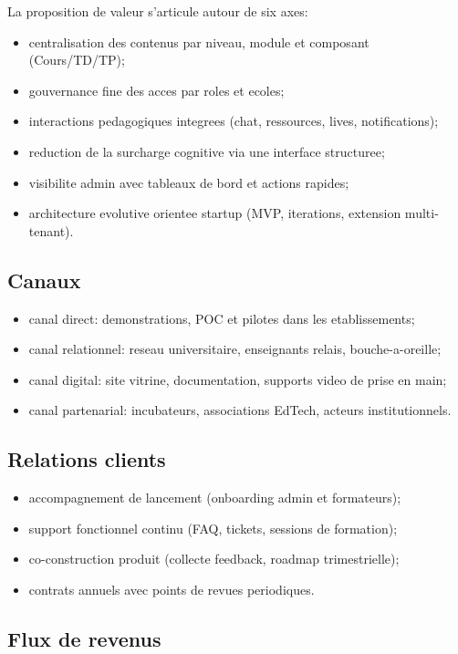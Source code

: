 ﻿\documentclass[12pt,a4paper,oneside]{report}
\begin{document}
La proposition de valeur s'articule autour de six axes:
\begin{itemize}
  \item centralisation des contenus par niveau, module et composant (Cours/TD/TP);
  \item gouvernance fine des acces par roles et ecoles;
  \item interactions pedagogiques integrees (chat, ressources, lives, notifications);
  \item reduction de la surcharge cognitive via une interface structuree;
  \item visibilite admin avec tableaux de bord et actions rapides;
  \item architecture evolutive orientee startup (MVP, iterations, extension multi-tenant).
\end{itemize}

\subsection{Canaux}

\begin{itemize}
  \item canal direct: demonstrations, POC et pilotes dans les etablissements;
  \item canal relationnel: reseau universitaire, enseignants relais, bouche-a-oreille;
  \item canal digital: site vitrine, documentation, supports video de prise en main;
  \item canal partenarial: incubateurs, associations EdTech, acteurs institutionnels.
\end{itemize}

\subsection{Relations clients}

\begin{itemize}
  \item accompagnement de lancement (onboarding admin et formateurs);
  \item support fonctionnel continu (FAQ, tickets, sessions de formation);
  \item co-construction produit (collecte feedback, roadmap trimestrielle);
  \item contrats annuels avec points de revues periodiques.
\end{itemize}

\subsection{Flux de revenus}
\end{document}
